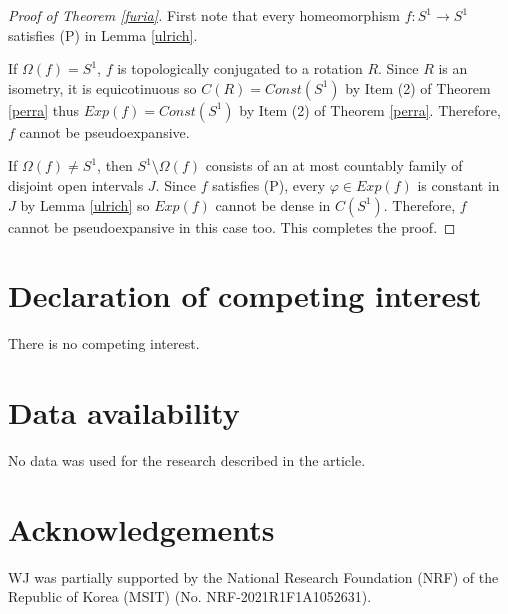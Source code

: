\documentclass[11pt,letterpaper]{amsart}
\begin{document}
\begin{proof}[Proof of Theorem \ref{furia}]
First note that every homeomorphism $f:S^1\to S^1$ satisfies (P) in Lemma  \ref{ulrich}.

If $\Omega(f)=S^1$, $f$ is topologically conjugated to a rotation $R$.
Since $R$ is an isometry, it is equicotinuous so $C(R)=Const(S^1)$
by Item (2) of Theorem \ref{perra} thus $Exp(f)=Const(S^1)$ by Item (2) of Theorem \ref{perra}.
Therefore, $f$ cannot be pseudoexpansive.

If $\Omega(f)\neq S^1$, then $S^1\setminus \Omega(f)$ consists of an at most countably family of disjoint open intervals $J$.
Since $f$ satisfies (P), every $\varphi\in Exp(f)$ is constant in $J$ by Lemma \ref{ulrich} so $Exp(f)$ cannot be dense in $C(S^1)$.
Therefore, $f$ cannot be pseudoexpansive in this case too.
This completes the proof.
\end{proof}











\section*{Declaration of competing interest}

\noindent
There is no competing interest.


\section*{Data availability}

\noindent
No data was used for the research described in the article.

\section*{Acknowledgements}


\noindent
WJ was partially supported by the National Research Foundation (NRF) of the Republic of Korea (MSIT) (No. NRF-2021R1F1A1052631).
\end{document}
